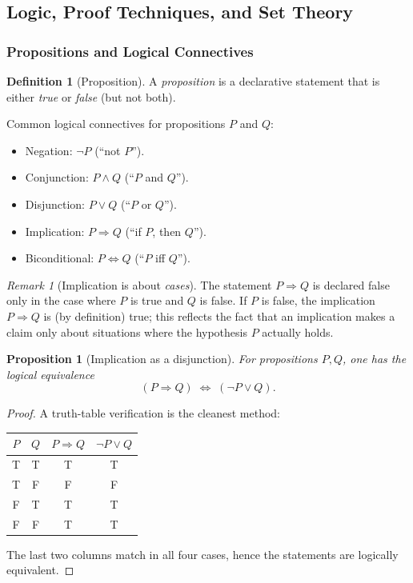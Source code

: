 \documentclass[12pt]{article}
\numberwithin{equation}{section}
\theoremstyle{plain}
\newtheorem{proposition}[theorem]{Proposition}
\theoremstyle{definition}
\newtheorem{definition}[theorem]{Definition}
\theoremstyle{remark}
\newtheorem{remark}[theorem]{Remark}
\begin{document}
\subsection{Logic, Proof Techniques, and Set Theory}

\subsubsection{Propositions and Logical Connectives}

\begin{definition}[Proposition]
A \emph{proposition} is a declarative statement that is either \emph{true} or \emph{false} (but not both).
\end{definition}

Common logical connectives for propositions $P$ and $Q$:
\begin{itemize}
  \item Negation: $\neg P$ (``not $P$'').
  \item Conjunction: $P\wedge Q$ (``$P$ and $Q$'').
  \item Disjunction: $P\vee Q$ (``$P$ or $Q$'').
  \item Implication: $P \Rightarrow Q$ (``if $P$, then $Q$'').
  \item Biconditional: $P \Leftrightarrow Q$ (``$P$ iff $Q$'').
\end{itemize}

\begin{remark}[Implication is about \emph{cases}]
The statement $P\Rightarrow Q$ is declared false only in the case where $P$ is true and $Q$ is false.  
If $P$ is false, the implication $P\Rightarrow Q$ is (by definition) true; this reflects the fact that an implication makes a claim only about situations where the hypothesis $P$ actually holds.
\end{remark}

\begin{proposition}[Implication as a disjunction]\label{prop:imp-disj}
For propositions $P,Q$, one has the logical equivalence
\[
(P \Rightarrow Q) \;\Leftrightarrow\; (\neg P \vee Q).
\]
\end{proposition}

\begin{proof}
A truth-table verification is the cleanest method:

\begin{center}
\begin{tabular}{cccc}
\toprule
$P$ & $Q$ & $P\Rightarrow Q$ & $\neg P \vee Q$ \\
\midrule
T & T & T & T \\
T & F & F & F \\
F & T & T & T \\
F & F & T & T \\
\bottomrule
\end{tabular}
\end{center}

The last two columns match in all four cases, hence the statements are logically equivalent.
\end{proof}
\end{document}
